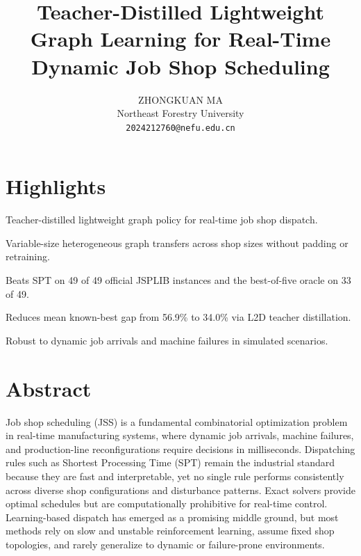 \documentclass{article}
\title{Teacher-Distilled Lightweight Graph Learning for Real-Time Dynamic Job Shop Scheduling}
\author{ZHONGKUAN MA\\ Northeast Forestry University\\ \texttt{2024212760@nefu.edu.cn}}
\date{}
\begin{document}
\maketitle


\section*{Highlights}

Teacher-distilled lightweight graph policy for real-time job shop dispatch.

Variable-size heterogeneous graph transfers across shop sizes without padding or retraining.

Beats SPT on 49 of 49 official JSPLIB instances and the best-of-five oracle on 33 of 49.

Reduces mean known-best gap from 56.9\% to 34.0\% via L2D teacher distillation.

Robust to dynamic job arrivals and machine failures in simulated scenarios.


\section*{Abstract}

Job shop scheduling (JSS) is a fundamental combinatorial optimization problem in real-time manufacturing systems, where dynamic job arrivals, machine failures, and production-line reconfigurations require decisions in milliseconds. Dispatching rules such as Shortest Processing Time (SPT) remain the industrial standard because they are fast and interpretable, yet no single rule performs consistently across diverse shop configurations and disturbance patterns. Exact solvers provide optimal schedules but are computationally prohibitive for real-time control. Learning-based dispatch has emerged as a promising middle ground, but most methods rely on slow and unstable reinforcement learning, assume fixed shop topologies, and rarely generalize to dynamic or failure-prone environments.
\end{document}
